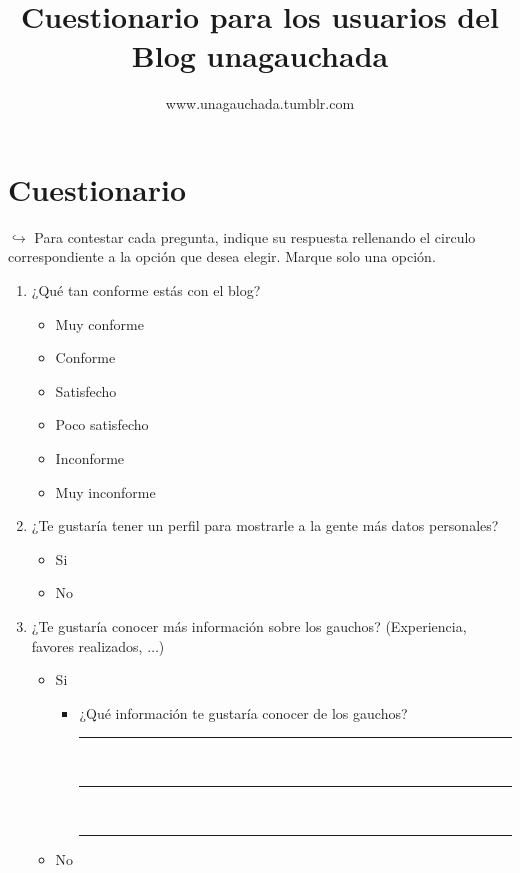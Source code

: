 \documentclass[a4paper,10pt]{article}
\title{Cuestionario para los usuarios del Blog unagauchada}
\author{www.unagauchada.tumblr.com}
\date{}
\begin{document}
\maketitle

\renewcommand{\labelitemi}{$\bigcirc$}

\section{Cuestionario}
$\hookrightarrow{}$ Para contestar cada pregunta, indique su respuesta rellenando el circulo correspondiente a la opción que desea elegir. Marque solo una opción.
\begin{enumerate}
    \item ¿Qué tan conforme estás con el blog?
    \begin{itemize}
        \item Muy conforme
        \item Conforme
        \item Satisfecho
        \item Poco satisfecho
        \item Inconforme
        \item Muy inconforme
    \end{itemize}
    
    \item ¿Te gustaría tener un perfil para mostrarle a la gente más datos personales?
    \begin{itemize}
        \item Si
        \item No
    \end{itemize}
    
    \item ¿Te gustaría conocer más información sobre los gauchos? (Experiencia, favores realizados, $\ldots$)
    \begin{itemize}
        \item Si
        \begin{itemize}
            \item ¿Qué información te gustaría conocer de los gauchos? 
            
            \rule{100mm}{0.1mm} \\
            \rule{100mm}{0.1mm} \\
            \rule{100mm}{0.1mm}
        \end{itemize}
        \item No
    \end{itemize}
    

\end{enumerate}
\end{document}
